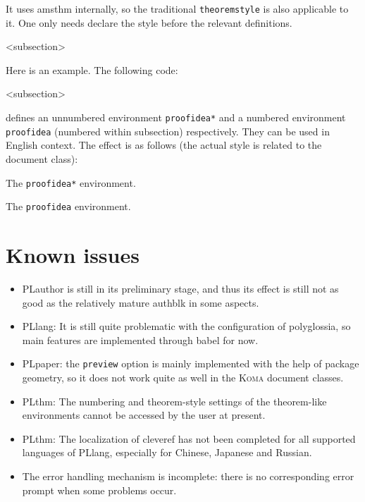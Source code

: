 \documentclass[allowbf]{lebhart}
\newenvironment{remind}[1][Remind]{%
    \begin{tcolorbox}[breakable,
        enhanced,
        width = \textwidth,
        colback = white, colbacktitle = paper,
        colframe = gray!50, boxrule=0.2mm,
        coltitle = black,
        fonttitle = \sffamily,
        attach boxed title to top left = {yshift=-\tcboxedtitleheight/2,  xshift=\tcboxedtitlewidth/4},
        boxed title style = {boxrule=0pt, colframe=paper},
        before skip = 0.3cm,
        after skip = 0.3cm,
        top = 3mm,
        bottom = 3mm,
        title={\scshape\sffamily #1}]%
}{\end{tcolorbox}}
\providecommand{\PLauthor}{\textsf{PLauthor}}
\providecommand{\PLlang}{\textsf{PLlang}}
\providecommand{\PLpaper}{\textsf{PLpaper}}
\providecommand{\PLthm}{\textsf{PLthm}}
\begin{document}
\begin{remind}
    It uses \textsf{amsthm} internally, so the traditional \texttt{theoremstyle} is also applicable to it. One only needs declare the style before the relevant definitions.
\end{remind}

\def\proofideanameEN{Idea}
<subsection>

\bigskip
Here is an example. The following code:
\begin{code}
  \def\proofideanameEN{Idea}
  <subsection>
\end{code}
defines an unnumbered environment \lstinline|proofidea*| and a numbered environment \lstinline|proofidea| (numbered within subsection) respectively. They can be used in English context. The effect is as follows (the actual style is related to the document class):

\begin{proofidea*}
    The \lstinline|proofidea*| environment.
\end{proofidea*}

\begin{proofidea}
    The \lstinline|proofidea| environment.
\end{proofidea}


\bigskip
\section{Known issues}

\begin{itemize}[itemsep=.6em]
    \item \PLauthor{} is still in its preliminary stage, and thus its effect is still not as good as the relatively mature \textsf{authblk} in some aspects.
    \item \PLlang{}: It is still quite problematic with the configuration of \textsf{polyglossia}, so main features are implemented through \textsf{babel} for now.
    \item \PLpaper{}: the \texttt{preview} option is mainly implemented with the help of package \textsf{geometry}, so it does not work quite as well in the \textsc{\textsf{Koma}} document classes.
    \item \PLthm{}: The numbering and theorem-style settings of the theorem-like environments cannot be accessed by the user at present.
    \item \PLthm{}: The localization of \textsf{cleveref} has not been completed for all supported languages of \PLlang{}, especially for Chinese, Japanese and Russian.
    \item The error handling mechanism is incomplete: there is no corresponding error prompt when some problems occur.
\end{itemize}
\end{document}
